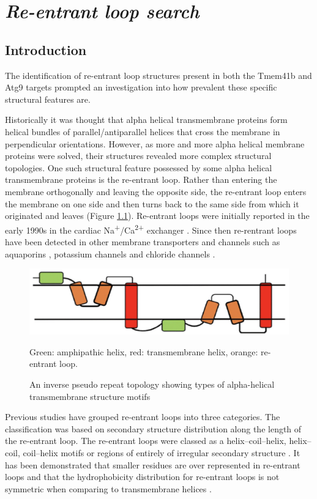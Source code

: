 \chapter{\emph{Re-entrant loop search}}
\section{Introduction}
The identification of re-entrant loop structures present in both the Tmem41b and Atg9 targets prompted an investigation into how prevalent these specific structural features are.  

Historically it was thought that alpha helical transmembrane proteins form helical bundles of parallel/antiparallel helices that cross the membrane in perpendicular orientations. However, as more and more alpha helical membrane proteins were solved, their structures revealed  more complex structural topologies.  One such structural feature possessed by some alpha helical transmembrane proteins is the re-entrant loop.  Rather than entering the membrane orthogonally and leaving the opposite side, the re-entrant loop enters the membrane on one side and then turns back to the same side from which it originated and leaves (Figure \ref{fig:topology}).  Re-entrant loops were initially reported in the early 1990s in the cardiac Na\textsuperscript{+}/Ca\textsuperscript{2+} exchanger \cite{iwamoto1999unique}. Since then re-rentrant loops have been detected in other membrane transporters and channels such as aquaporins \cite{de2001refined}, potassium channels \cite{zhou2001chemistry} and chloride channels \cite{dutzler2002x}. 

\begin{figure}[th!]
    \centering
    \includegraphics[width=150mm, scale=0.75]{Pfam/topology.png}
    \caption{An inverse pseudo repeat topology showing types of alpha-helical transmembrane structure motifs}
    \label{fig:topology}
    \small
    Green: amphipathic helix, red: transmembrane helix, orange: re-entrant loop.
\end{figure}

Previous studies \cite{Yan2010} have grouped re-entrant loops into three categories. The classification was based on secondary structure distribution along the length of the re-entrant loop.  The re-entrant loops were classed as a helix–coil–helix, helix–coil, coil–helix motifs or regions of entirely of irregular secondary structure \cite{Yan2010}. It has been demonstrated that smaller residues are over represented in re-entrant loops and that the hydrophobicity distribution for re-entrant loops is not symmetric when comparing to transmembrane helices \cite{Yan2010}.  

